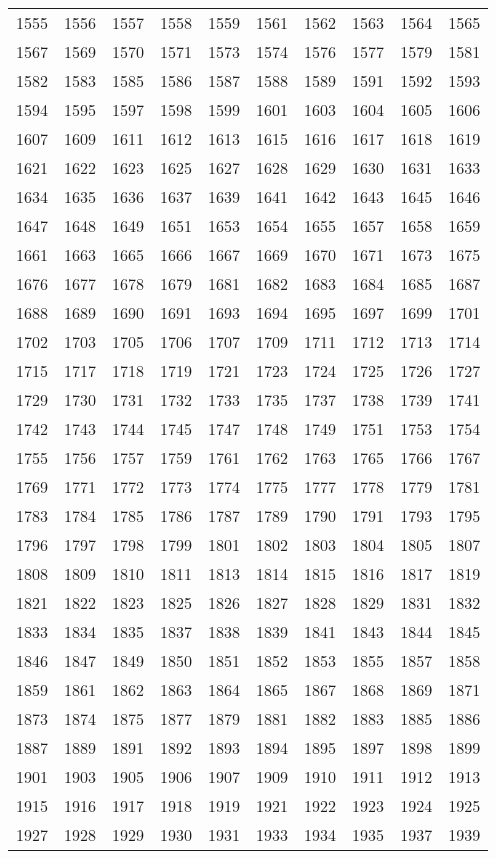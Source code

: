 \begin{longtable}{*{10}{l}}
1555&1556&1557&1558&1559&1561&1562&1563&1564&1565\\
1567&1569&1570&1571&1573&1574&1576&1577&1579&1581\\
1582&1583&1585&1586&1587&1588&1589&1591&1592&1593\\
1594&1595&1597&1598&1599&1601&1603&1604&1605&1606\\
1607&1609&1611&1612&1613&1615&1616&1617&1618&1619\\
1621&1622&1623&1625&1627&1628&1629&1630&1631&1633\\
1634&1635&1636&1637&1639&1641&1642&1643&1645&1646\\
1647&1648&1649&1651&1653&1654&1655&1657&1658&1659\\
1661&1663&1665&1666&1667&1669&1670&1671&1673&1675\\
1676&1677&1678&1679&1681&1682&1683&1684&1685&1687\\
1688&1689&1690&1691&1693&1694&1695&1697&1699&1701\\
1702&1703&1705&1706&1707&1709&1711&1712&1713&1714\\
1715&1717&1718&1719&1721&1723&1724&1725&1726&1727\\
1729&1730&1731&1732&1733&1735&1737&1738&1739&1741\\
1742&1743&1744&1745&1747&1748&1749&1751&1753&1754\\
1755&1756&1757&1759&1761&1762&1763&1765&1766&1767\\
1769&1771&1772&1773&1774&1775&1777&1778&1779&1781\\
1783&1784&1785&1786&1787&1789&1790&1791&1793&1795\\
1796&1797&1798&1799&1801&1802&1803&1804&1805&1807\\
1808&1809&1810&1811&1813&1814&1815&1816&1817&1819\\
1821&1822&1823&1825&1826&1827&1828&1829&1831&1832\\
1833&1834&1835&1837&1838&1839&1841&1843&1844&1845\\
1846&1847&1849&1850&1851&1852&1853&1855&1857&1858\\
1859&1861&1862&1863&1864&1865&1867&1868&1869&1871\\
1873&1874&1875&1877&1879&1881&1882&1883&1885&1886\\
1887&1889&1891&1892&1893&1894&1895&1897&1898&1899\\
1901&1903&1905&1906&1907&1909&1910&1911&1912&1913\\
1915&1916&1917&1918&1919&1921&1922&1923&1924&1925\\
1927&1928&1929&1930&1931&1933&1934&1935&1937&1939\\

\end{longtable}
